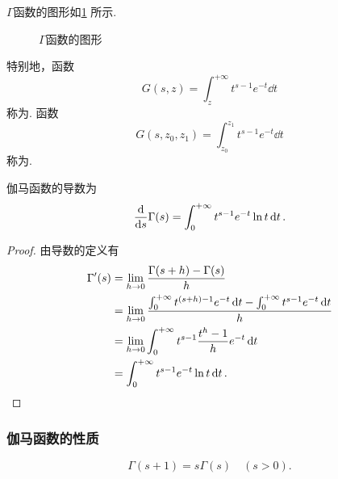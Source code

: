 \(\Gamma\)函数的图形如\cref{figure:定积分.伽马函数} 所示.

\begin{figure}%
\centering
{}
\caption{\(\Gamma\)函数的图形}
\label{figure:定积分.伽马函数}
\end{figure}

特别地，函数\[
G(s,z) = \int_z^{+\infty} t^{s-1} e^{-t} \dd{t}
\]称为.
函数\[
G(s,z_0,z_1) = \int_{z_0}^{z_1} t^{s-1} e^{-t} \dd{t}
\]称为.

\begin{proposition}
伽马函数的导数为\begin{equation}
	\dv{s} \Gamma(s)
	= \int_0^{+\infty} t^{s-1} e^{-t} \ln t \dd{t}.
\end{equation}
\begin{proof}
由导数的定义有\begin{align*}
	\Gamma'(s)
	&= \lim_{h\to0} \frac{\Gamma(s+h)-\Gamma(s)}{h} \\
	&= \lim_{h\to0} \frac{
			\int_0^{+\infty} t^{(s+h)-1} e^{-t} \dd{t}
			- \int_0^{+\infty} t^{s-1} e^{-t} \dd{t}
		}{h} \\
	&= \lim_{h\to0}
		\int_0^{+\infty} t^{s-1} \frac{t^h - 1}{h} e^{-t} \dd{t} \\
	&= \int_0^{+\infty} t^{s-1} e^{-t} \ln t \dd{t}.
	\qedhere
\end{align*}
\end{proof}
\end{proposition}

\subsubsection{伽马函数的性质}
\begin{property}[递推公式]
\begin{equation}\label{equation:伽马函数.递推公式}
	\Gamma(s+1) = s \Gamma(s) \quad (s > 0).
\end{equation}
\end{property}

